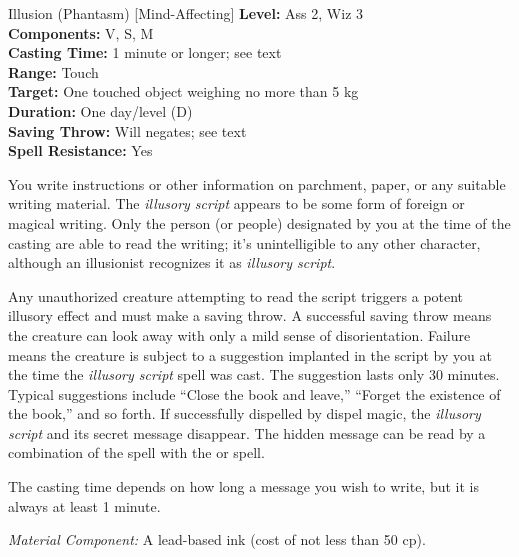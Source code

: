{Illusion (Phantasm) [Mind-Affecting]}
{
	\textbf{Level:}
	Ass 2, Wiz 3\\
	\textbf{Components:}
	V, S, M\\
	\textbf{Casting Time:}
	1 minute or longer; see text\\
	\textbf{Range:}
	Touch\\
	\textbf{Target:}
	One touched object weighing no more than 5 kg\\
	\textbf{Duration:}
	One day/level (D)\\
	\textbf{Saving Throw:}
	Will negates; see text\\
	\textbf{Spell Resistance:}
	Yes\\
}
{
	You write instructions or other information on parchment, paper, or any suitable writing material. The \emph{illusory script} appears to be some form of foreign or magical writing. Only the person (or people) designated by you at the time of the casting are able to read the writing; it's unintelligible to any other character, although an illusionist recognizes it as \emph{illusory script}.

	Any unauthorized creature attempting to read the script triggers a potent illusory effect and must make a saving throw. A successful saving throw means the creature can look away with only a mild sense of disorientation. Failure means the creature is subject to a suggestion implanted in the script by you at the time the \emph{illusory script} spell was cast. The suggestion lasts only 30 minutes. Typical suggestions include ``Close the book and leave,'' ``Forget the existence of the book,'' and so forth. If successfully dispelled by dispel magic, the \emph{illusory script} and its secret message disappear. The hidden message can be read by a combination of the  spell with the  or  spell.

	The casting time depends on how long a message you wish to write, but it is always at least 1 minute.

	\textit{Material Component:}
	A lead-based ink (cost of not less than 50 cp).

}
